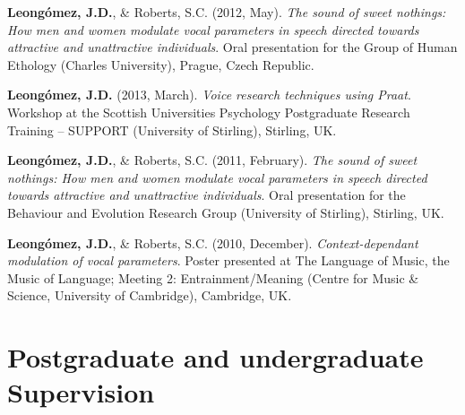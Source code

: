 \documentclass[11pt, a4paper]{awesome-cv}
\begin{document}
\textbf{Leongómez, J.D.}, \& Roberts, S.C. (2012, May). \emph{The sound of sweet nothings: How men and women modulate vocal parameters in speech directed towards attractive and unattractive individuals}. Oral presentation for the Group of Human Ethology (Charles University), Prague, Czech Republic.

\textbf{Leongómez, J.D.} (2013, March). \emph{Voice research techniques using Praat}. Workshop at the Scottish Universities Psychology Postgraduate Research Training -- SUPPORT (University of Stirling), Stirling, UK.

\textbf{Leongómez, J.D.}, \& Roberts, S.C. (2011, February). \emph{The sound of sweet nothings: How men and women modulate vocal parameters in speech directed towards attractive and unattractive individuals}. Oral presentation for the Behaviour and Evolution Research Group (University of Stirling), Stirling, UK.

\textbf{Leongómez, J.D.}, \& Roberts, S.C. (2010, December). \emph{Context-dependant modulation of vocal parameters}. Poster presented at The Language of Music, the Music of Language; Meeting 2: Entrainment/Meaning (Centre for Music \& Science, University of Cambridge), Cambridge, UK.

\endgroup

\hypertarget{postgraduate-and-undergraduate-supervision}{%
\section{Postgraduate and undergraduate Supervision}\label{postgraduate-and-undergraduate-supervision}}
\end{document}
